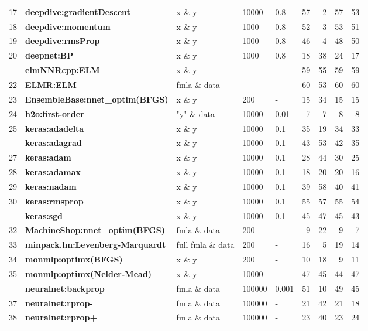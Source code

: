\begin{Schunk}
\begin{table}
\begin{tabular}[t]{r>{}llllrrrr}
17 & \textbf{deepdive:gradientDescent} & x \& y & 10000 & 0.8 & 57 & 2 & 57 & 53\\
18 & \textbf{deepdive:momentum} & x \& y & 1000 & 0.8 & 52 & 3 & 53 & 51\\
19 & \textbf{deepdive:rmsProp} & x \& y & 1000 & 0.8 & 46 & 4 & 48 & 50\\
20 & \textbf{deepnet:BP} & x \& y & 1000 & 0.8 & 18 & 38 & 24 & 17\\
\addlinespace
21 & \textbf{elmNNRcpp:ELM} & x \& y & - & - & 59 & 55 & 59 & 59\\
22 & \textbf{ELMR:ELM} & fmla \& data & - & - & 60 & 53 & 60 & 60\\
23 & \textbf{EnsembleBase:nnet\_optim(BFGS)} & x \& y & 200 & - & 15 & 34 & 15 & 15\\
24 & \textbf{h2o:first-order} & "y" \& data & 10000 & 0.01 & 7 & 7 & 8 & 8\\
25 & \textbf{keras:adadelta} & x \& y & 10000 & 0.1 & 35 & 19 & 34 & 33\\
\addlinespace
26 & \textbf{keras:adagrad} & x \& y & 10000 & 0.1 & 43 & 53 & 42 & 35\\
27 & \textbf{keras:adam} & x \& y & 10000 & 0.1 & 28 & 44 & 30 & 25\\
28 & \textbf{keras:adamax} & x \& y & 10000 & 0.1 & 18 & 20 & 20 & 16\\
29 & \textbf{keras:nadam} & x \& y & 10000 & 0.1 & 39 & 58 & 40 & 41\\
30 & \textbf{keras:rmsprop} & x \& y & 10000 & 0.1 & 55 & 57 & 55 & 54\\
\addlinespace
31 & \textbf{keras:sgd} & x \& y & 10000 & 0.1 & 45 & 47 & 45 & 43\\
32 & \textbf{MachineShop:nnet\_optim(BFGS)} & fmla \& data & 200 & - & 9 & 22 & 9 & 7\\
33 & \textbf{minpack.lm:Levenberg-Marquardt} & full fmla \& data & 200 & - & 16 & 5 & 19 & 14\\
34 & \textbf{monmlp:optimx(BFGS)} & x \& y & 200 & - & 10 & 18 & 9 & 11\\
35 & \textbf{monmlp:optimx(Nelder-Mead)} & x \& y & 10000 & - & 47 & 45 & 44 & 47\\
\addlinespace
36 & \textbf{neuralnet:backprop} & fmla \& data & 100000 & 0.001 & 51 & 10 & 49 & 45\\
37 & \textbf{neuralnet:rprop-} & fmla \& data & 100000 & - & 21 & 42 & 21 & 18\\
38 & \textbf{neuralnet:rprop+} & fmla \& data & 100000 & - & 23 & 40 & 23 & 24\\

\end{tabular}
\end{table}
\end{Schunk}
